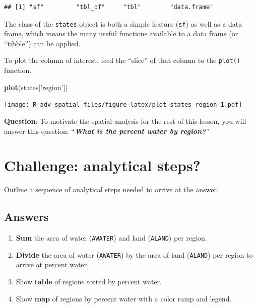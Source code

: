 \documentclass[]{book}
\newenvironment{Shaded}{\begin{snugshade}}{\end{snugshade}}
\newcommand{\KeywordTok}[1]{\textcolor[rgb]{0.13,0.29,0.53}{\textbf{{#1}}}}
\newcommand{\StringTok}[1]{\textcolor[rgb]{0.31,0.60,0.02}{{#1}}}
\newcommand{\NormalTok}[1]{{#1}}
\providecommand{\tightlist}{%
  \setlength{\itemsep}{0pt}\setlength{\parskip}{0pt}}
\theoremstyle{definition}
\theoremstyle{definition}
\theoremstyle{definition}
\theoremstyle{remark}
\begin{document}
\begin{verbatim}
## [1] "sf"         "tbl_df"     "tbl"        "data.frame"
\end{verbatim}

The class of the \texttt{states} object is both a simple feature
(\texttt{sf}) as well as a data frame, which means the many useful
functions available to a data frame (or ``tibble'') can be applied.

To plot the column of interest, feed the ``slice'' of that column to the
\texttt{plot()} function.

\begin{Shaded}
\begin{Highlighting}[]
\KeywordTok{plot}\NormalTok{(states[}\StringTok{'region'}\NormalTok{])}
\end{Highlighting}
\end{Shaded}

\texttt{[image: R-adv-spatial\_files/figure-latex/plot-states-region-1.pdf]}

\textbf{Question}: To motivate the spatial analysis for the rest of this
lesson, you will answer this question: ``\emph{\textbf{What is the
percent water by region?}}''

\section{Challenge: analytical steps?}\label{challenge-analytical-steps}

Outline a sequence of analytical steps needed to arrive at the answer.

\subsection{Answers}\label{answers}

\begin{enumerate}
\def\labelenumi{\arabic{enumi}.}
\tightlist
\item
  \textbf{Sum} the area of water (\texttt{AWATER}) and land
  (\texttt{ALAND}) per region.
\item
  \textbf{Divide} the area of water (\texttt{AWATER}) by the area of
  land (\texttt{ALAND}) per region to arrive at percent water.
\item
  Show \textbf{table} of regions sorted by percent water.
\item
  Show \textbf{map} of regions by percent water with a color ramp and
  legend.
\end{enumerate}
\end{document}
